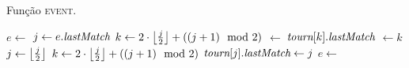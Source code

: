 \begin{algorithm}
    \caption{Função \textsc{event}.} \label{torneioi:evento}
    \begin{algorithmic}[1]
            \State $e \leftarrow  $ 
                \State $j \leftarrow e.\textit{lastMatch}$
                \State $k \leftarrow 2\cdot \left\lfloor \frac{j}{2} \right\rfloor
                + ((j + 1)\mod2)$ 
                    \State {}
                    $\leftarrow~$\torneio[$j$]
                    \State $\textit{tourn}[k].\textit{lastMatch}$ $\leftarrow k$
                    \State {}
                    \State $j \leftarrow \left\lfloor \frac{j}{2} \right\rfloor$
                    \State $k \leftarrow 2\cdot \left\lfloor \frac{j}{2} \right\rfloor
                    + ((j + 1)\mod2)$ 
                \EndWhile
                \State $\textit{tourn}[j].\textit{lastMatch} \leftarrow j$
                \State {}
                \State $e \leftarrow  $ 
            \EndWhile
        \EndFunction
    \end{algorithmic}
\end{algorithm}